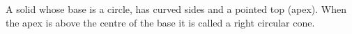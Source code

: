 A solid whose base is a circle, has curved sides and a pointed top (apex).
When the apex is above the centre of the base it is called a right circular cone.